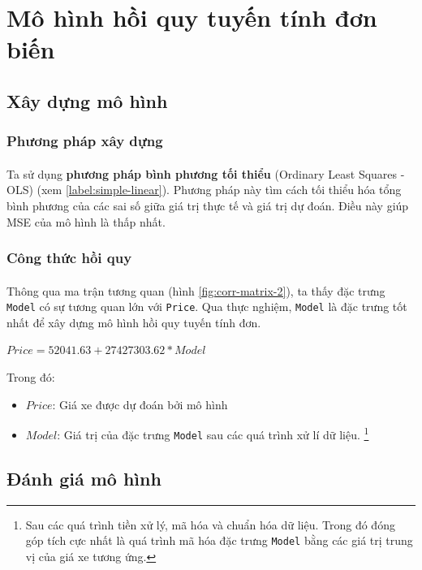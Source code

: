 \newpage
\section{Mô hình hồi quy tuyến tính đơn biến}
\subsection{Xây dựng mô hình}
\subsubsection{Phương pháp xây dựng}
\paragraph{}{Ta sử dụng \textbf{phương pháp bình phương tối thiểu} (Ordinary Least Squares - OLS) (xem \ref{label:simple-linear}). Phương pháp này tìm cách tối thiểu hóa tổng bình phương của các sai số giữa giá trị thực tế và giá trị dự đoán. Điều này giúp MSE của mô hình là thấp nhất.}
\subsubsection{Công thức hồi quy}
\paragraph{}{Thông qua ma trận tương quan (hình \ref{fig:corr-matrix-2}), ta thấy đặc trưng \texttt{Model} có sự tương quan lớn với \texttt{Price}. Qua thực nghiệm, \texttt{Model} là đặc trưng tốt nhất để xây dựng mô hình hồi quy tuyến tính đơn.}

\begin{center}
\large $Price = 52041.63 + 27427303.62 * Model$
\end{center}

Trong đó:
\begin{itemize}
    \item $Price$: Giá xe được dự đoán bởi mô hình
    \item $Model$: Giá trị của đặc trưng \texttt{Model} sau các quá trình xử lí dữ liệu. \footnote{Sau các quá trình tiền xử lý, mã hóa và chuẩn hóa dữ liệu. Trong đó đóng góp tích cực nhất là quá trình mã hóa đặc trưng \texttt{Model} bằng các giá trị trung vị của giá xe tương ứng.}
\end{itemize}

\subsection{Đánh giá mô hình}

